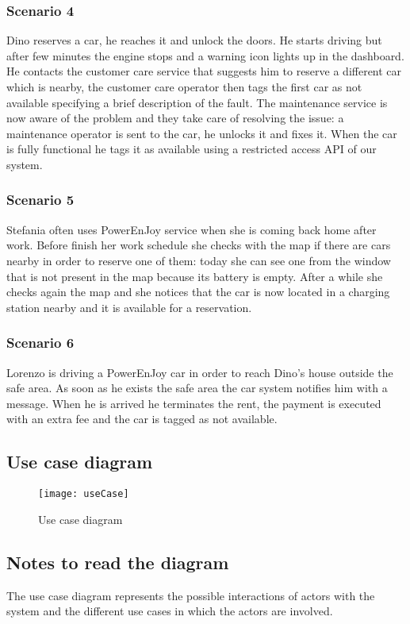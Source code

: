 \subsubsection{Scenario 4}
\label{scenario:4}
Dino reserves a car, he reaches it and unlock the doors. He starts driving but after few minutes the engine stops and a warning icon lights up in the dashboard. He contacts the customer care service that suggests him to reserve a different car which is nearby, the customer care operator then tags the first car as not available specifying a brief description of the fault. The maintenance service is now aware of the problem and they take care of resolving the issue: a maintenance operator is sent to the car, he unlocks it  and fixes it. When the car is fully functional he tags it as available using a restricted access API of our system.

\subsubsection{Scenario 5}
\label{scenario:5}
Stefania often uses PowerEnJoy service when she is coming back home after work. Before finish her work schedule she checks with the map if there are cars nearby in order to reserve one of them: today she can see one from the window that is not present in the map because its battery is empty. After a while she checks again the map and she notices that the car is now located in a charging station nearby and it is available for a reservation.
	
\subsubsection{Scenario 6}
\label{scenario:6}
Lorenzo is driving a PowerEnJoy car in order to reach Dino's house outside the safe area. As soon as he exists the safe area the car system notifies him with a message. When he is arrived he terminates the rent, the payment is executed with an extra fee and the car is tagged as not available.

\clearpage
\subsection{Use case diagram}

\begin{figure}[h!]
	\centering
	\texttt{[image: useCase]}
	\caption{
		\label{fig:useCase} 
		Use case diagram
	}
\end{figure}
\subsection{Notes to read the diagram}
The use case diagram represents the possible interactions of actors with the system and the different use cases in which the actors are involved.\\

